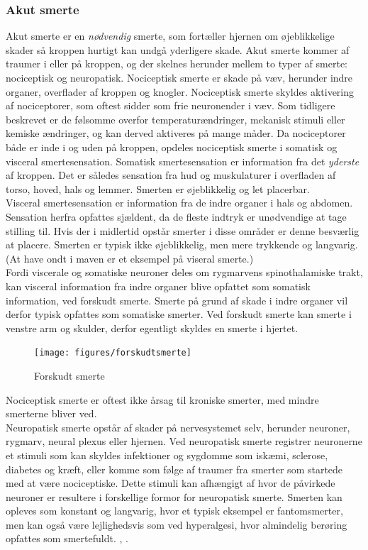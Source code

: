 \subsubsection{Akut smerte}
Akut smerte er en \textit{nødvendig} smerte, som fortæller hjernen om øjeblikkelige skader så kroppen hurtigt kan undgå yderligere skade. Akut smerte kommer af traumer i eller på kroppen, og der skelnes herunder mellem to typer af smerte: nociceptisk og neuropatisk. Nociceptisk smerte er skade på væv, herunder indre organer, overflader af kroppen og knogler. Nociceptisk smerte skyldes aktivering af nociceptorer, som oftest sidder som frie neuronender i væv. Som tidligere beskrevet er de følsomme overfor temperaturændringer, mekanisk stimuli eller kemiske ændringer, og kan derved aktiveres på mange måder. Da nociceptorer både er inde i og uden på kroppen, opdeles nociceptisk smerte i somatisk og visceral smertesensation. Somatisk smertesensation er information fra det \textit{yderste} af kroppen. Det er således sensation fra hud og muskulaturer i overfladen af torso, hoved, hals og lemmer. \citep{Martini} Smerten er øjeblikkelig og let placerbar. \\
Visceral smertesensation er information fra de indre organer i hals og abdomen. Sensation herfra opfattes sjældent, da de fleste indtryk er unødvendige at tage stilling til. Hvis der i midlertid opstår smerter i disse områder er denne besværlig at placere. Smerten er typisk ikke øjeblikkelig, men mere trykkende og langvarig. (At have ondt i maven er et eksempel på viseral smerte.) \\
Fordi viscerale og somatiske neuroner deles om rygmarvens spinothalamiske trakt, kan visceral information fra indre organer blive opfattet som somatisk information, ved forskudt smerte. Smerte på grund af skade i indre organer vil derfor typisk opfattes som somatiske smerter. Ved forskudt smerte kan smerte i venstre arm og skulder, derfor egentligt skyldes en smerte i hjertet.

\begin{figure}[H]
	\caption{Forskudt smerte}
	\label{forskudtsmerte}
	\centering
	\texttt{[image: figures/forskudtsmerte]}
	\flushleft
	\textit{\citep{Martini}}
\end{figure}


Nociceptisk smerte er oftest ikke årsag til kroniske smerter, med mindre smerterne bliver ved.\\ 
Neuropatisk smerte opstår af skader på nervesystemet selv, herunder neuroner, rygmarv, neural plexus eller hjernen. 
Ved neuropatisk smerte registrer neuronerne et stimuli som kan skyldes infektioner og sygdomme som iskæmi, sclerose, diabetes og kræft, eller komme som følge af traumer fra smerter som startede med at være nociceptiske. Dette stimuli kan afhængigt af hvor de påvirkede neuroner er resultere i forskellige formor for neuropatisk smerte. Smerten kan opleves som konstant og langvarig, hvor et typisk eksempel er fantomsmerter, men kan også være lejlighedsvis som ved hyperalgesi, hvor almindelig berøring opfattes som smertefuldt. \citep{Giangregorio1997}, \citep{Carmon}.

